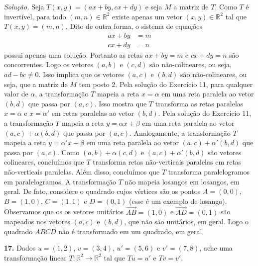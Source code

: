 \documentclass[a4paper,11pt]{article}
\newcommand{\R}{\mathbb{R}}
\begin{document}
\emph{Solução.}
Seja $T(x,y) = (ax + by, cx + dy)$ e seja $M$ a matriz de $T$.
Como $T$ é invertível, para todo $(m,n) \in \R^2$ existe apenas um vetor $(x,y) \in \R^2$ tal que $T(x,y) = (m,n)$.
Dito de outra forma, o sistema de equações
\begin{align*}
  ax + by & = m \\
  cx + dy & = n
\end{align*}
possui apenas uma solução.
Portanto as retas $ax + by = m$ e $cx + dy = n$ são concorrentes.
Logo os vetores $(a,b)$ e $(c,d)$ são não-colineares, ou seja, $ad - bc \neq 0$.
Isso implica que os vetores $(a,c)$ e $(b,d)$ são não-colineares, ou seja, que a matriz de $M$ tem posto 2.
Pela solução do Exercício 11, para qualquer valor de $\alpha$, a transformação $T$ mapeia a reta $x = \alpha$ em uma reta paralela ao vetor $(b,d)$ que passa por $(a,c)$.
Isso mostra que $T$ transforma as retas paralelas $x = \alpha$ e $x = \alpha'$ em retas paralelas ao vetor $(b,d)$.
Pela solução do Exercício 11, a transformação $T$ mapeia a reta $y = \alpha x + \beta$ em uma reta paralela ao vetor $(a,c) + \alpha(b,d)$ que passa por $(a,c)$.
Analogamente, a transformação $T$ mapeia a reta $y = \alpha' x + \beta$ em uma reta paralela ao vetor $(a,c) + \alpha'(b,d)$ que passa por $(a,c)$.
Como $(a,b) + \alpha(c,d)$ e $(a,c) + \alpha'(b,d)$ são vetores colineares, concluímos que $T$ transforma retas não-verticais paralelas em retas não-verticais paralelas.
Além disso, concluímos que $T$ transforma paralelogramos em paralelogramos.
A transformação $T$ não mapeia losangos em losangos, em geral.
De fato, considere o quadrado cujos vértices são os pontos $A = (0,0)$, $B = (1,0)$, $C = (1,1)$ e $D = (0,1)$ (esse é um exemplo de losango).
Observamos que os os vetores unitários $\overrightarrow{AB} = (1,0)$ e $\overrightarrow{AD} = (0,1)$ são mapeados nos vetores $(a,c)$ e $(b,d)$, que não são unitários, em geral.
Logo o quadrado $ABCD$ não é transformado em um quadrado, em geral.

\vspace{\baselineskip}

\textbf{17.}
Dados $u = (1,2)$, $v = (3,4)$, $u' = (5,6)$ e $v' = (7,8)$, ache uma transformação linear $T : \mathbb{R}^2 \to \mathbb{R}^2$ tal que $Tu = u'$ e $Tv = v'$.

\vspace{\baselineskip}
\end{document}
